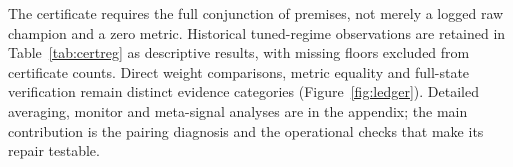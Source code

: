 The certificate requires the full conjunction of premises, not merely a
logged raw champion and a zero metric. Historical tuned-regime observations
are retained in Table~\ref{tab:certreg} as descriptive results, with missing
floors excluded from certificate counts. Direct weight comparisons, metric
equality and full-state verification remain distinct evidence categories
(Figure~\ref{fig:ledger}). Detailed averaging, monitor and meta-signal analyses
are in the appendix; the main contribution is the pairing diagnosis and
the operational checks that make its repair testable.
